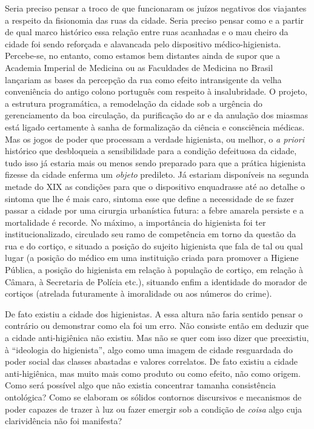 Seria preciso pensar a troco de que funcionaram os juízos negativos dos
viajantes a respeito da fisionomia das ruas da cidade. Seria preciso
pensar como e a partir de qual marco histórico essa relação entre ruas
acanhadas e o mau cheiro da cidade foi sendo reforçada e alavancada pelo
dispositivo médico-higienista. Percebe-se, no entanto, como estamos bem
distantes ainda de supor que a Academia Imperial de Medicina ou as
Faculdades de Medicina no Brasil lançariam as bases da percepção da rua
como efeito intransigente da velha conveniência do antigo colono
português com respeito à insalubridade. O projeto, a estrutura
programática, a remodelação da cidade sob a urgência do gerenciamento da
boa circulação, da purificação do ar e da anulação dos miasmas está
ligado certamente à sanha de formalização da ciência e consciência
médicas. Mas os jogos de poder que processam a verdade higienista, ou
melhor, o \textit{a priori} histórico que desbloqueia a sensibilidade para
a condição defeituosa da cidade, tudo isso já estaria mais ou menos
sendo preparado para que a prática higienista fizesse da cidade enferma
um \textit{objeto} predileto. Já estariam disponíveis na segunda metade do
XIX as condições para que o dispositivo enquadrasse até ao detalhe o
sintoma que lhe é mais caro, sintoma esse que define a necessidade de se
fazer passar a cidade por uma cirurgia urbanística futura: a febre
amarela persiste e a mortalidade é recorde. No máximo, a importância do
higienista foi ter institucionalizado, circulado seu ramo de competência
em torno da questão da rua e do cortiço, e situado a posição do sujeito
higienista que fala de tal ou qual lugar (a posição do médico em uma
instituição criada para promover a Higiene Pública, a posição do
higienista em relação à população de cortiço, em relação à Câmara, à
Secretaria de Polícia etc.), situando enfim a identidade do morador de
cortiços (atrelada futuramente à imoralidade ou aos números do crime).

De fato existiu a cidade dos higienistas. A essa altura não faria
sentido pensar o contrário ou demonstrar como ela foi um erro. Não
consiste então em deduzir que a cidade anti-higiênica não existiu. Mas
não se quer com isso dizer que preexistiu, à ``ideologia do
higienista'', algo como uma imagem de cidade resguardada do poder social
das classes abastadas e valores correlatos. De fato existiu a cidade
anti-higiênica, mas muito mais como produto ou como efeito, não como
origem. Como será possível algo que não existia concentrar tamanha
consistência ontológica? Como se elaboram os sólidos contornos
discursivos e mecanismos de poder capazes de trazer à luz ou fazer
emergir sob a condição de \textit{coisa} algo cuja clarividência não foi
manifesta?

